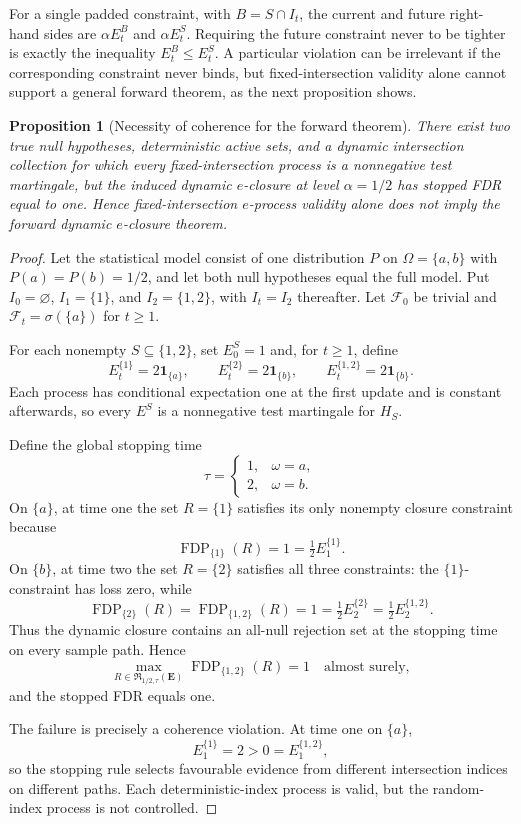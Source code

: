 \documentclass[11pt]{article}
\numberwithin{equation}{section}
\theoremstyle{plain}
\newtheorem{proposition}[theorem]{Proposition}
\theoremstyle{definition}
\newcommand{\F}{\mathcal F}
\newcommand{\Rfam}{\mathfrak R}
\newcommand{\FDP}{\operatorname{FDP}}
\newcommand{\one}{\mathbf 1}
\begin{document}
For a single padded constraint, with $B=S\cap I_t$, the current and future right-hand sides are $\alpha E_t^B$ and $\alpha E_t^S$. Requiring the future constraint never to be tighter is exactly the inequality $E_t^B\leq E_t^S$. A particular violation can be irrelevant if the corresponding constraint never binds, but fixed-intersection validity alone cannot support a general forward theorem, as the next proposition shows.

\begin{proposition}[Necessity of coherence for the forward theorem]\label{prop:coherence-necessary}
There exist two true null hypotheses, deterministic active sets, and a dynamic intersection collection for which every fixed-intersection process is a nonnegative test martingale, but the induced dynamic $e$-closure at level $\alpha=1/2$ has stopped FDR equal to one. Hence fixed-intersection $e$-process validity alone does not imply the forward dynamic $e$-closure theorem.
\end{proposition}

\begin{proof}
Let the statistical model consist of one distribution $P$ on $\Omega=\{a,b\}$ with $P(a)=P(b)=1/2$, and let both null hypotheses equal the full model. Put $I_0=\varnothing$, $I_1=\{1\}$, and $I_2=\{1,2\}$, with $I_t=I_2$ thereafter. Let $\F_0$ be trivial and $\F_t=\sigma(\{a\})$ for $t\geq1$.

For each nonempty $S\subseteq\{1,2\}$, set $E_0^S=1$ and, for $t\geq1$, define
\[
 E_t^{\{1\}}=2\one_{\{a\}},\qquad
 E_t^{\{2\}}=2\one_{\{b\}},\qquad
 E_t^{\{1,2\}}=2\one_{\{b\}}.
\]
Each process has conditional expectation one at the first update and is constant afterwards, so every $E^S$ is a nonnegative test martingale for $H_S$.

Define the global stopping time
\[
 \tau=\begin{cases}1,&\omega=a,\\2,&\omega=b.\end{cases}
\]
On $\{a\}$, at time one the set $R=\{1\}$ satisfies its only nonempty closure constraint because
\[
 \FDP_{\{1\}}(R)=1=\tfrac12 E_1^{\{1\}}.
\]
On $\{b\}$, at time two the set $R=\{2\}$ satisfies all three constraints: the $\{1\}$-constraint has loss zero, while
\[
 \FDP_{\{2\}}(R)=\FDP_{\{1,2\}}(R)=1
 =\tfrac12E_2^{\{2\}}=\tfrac12E_2^{\{1,2\}}.
\]
Thus the dynamic closure contains an all-null rejection set at the stopping time on every sample path. Hence
\[
 \max_{R\in\Rfam_{1/2,\tau}(\mathbf E)}\FDP_{\{1,2\}}(R)=1
 \quad\text{almost surely},
\]
and the stopped FDR equals one.

The failure is precisely a coherence violation. At time one on $\{a\}$,
\[
 E_1^{\{1\}}=2>0=E_1^{\{1,2\}},
\]
so the stopping rule selects favourable evidence from different intersection indices on different paths. Each deterministic-index process is valid, but the random-index process is not controlled.
\end{proof}
\end{document}
